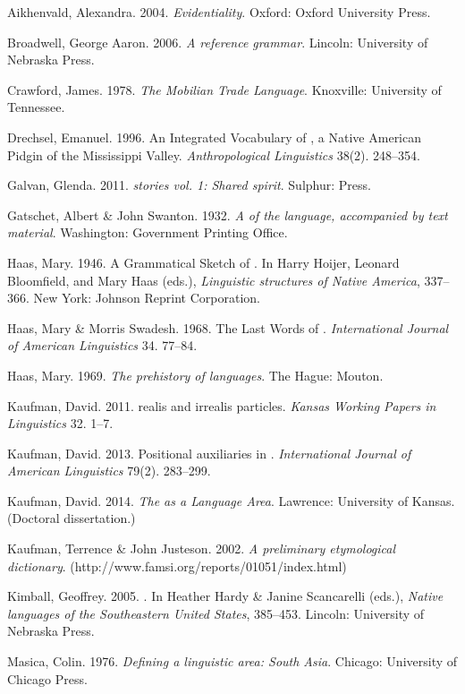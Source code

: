 \documentclass[output=paper]{LSP/langsci}
\begin{document}
\begin{reflist}

Aikhenvald, Alexandra. 2004. \emph{Evidentiality}. Oxford: Oxford University Press.

Broadwell, George Aaron. 2006. \emph{A  reference grammar}. Lincoln: University of Nebraska Press.

Crawford, James. 1978. \emph{The Mobilian Trade Language}. Knoxville: University of Tennessee.

Drechsel, Emanuel. 1996. An Integrated Vocabulary of , a Native American Pidgin of the Mississippi Valley. \emph{Anthropological Linguistics} 38(2). 248--354.

Galvan, Glenda. 2011. \emph{ stories vol. 1: Shared spirit}. Sulphur:  Press.

Gatschet, Albert \& John Swanton. 1932. \emph{A  of the  language, accompanied by text material}. Washington: Government Printing Office.

Haas, Mary. 1946. A Grammatical Sketch of . In Harry Hoijer, Leonard Bloomfield, and Mary Haas (eds.), \emph{Linguistic structures of Native America}, 337--366. New York: Johnson Reprint Corporation.

Haas, Mary \& Morris Swadesh. 1968. The Last Words of . \emph{International Journal of American Linguistics} 34. 77--84.

Haas, Mary. 1969. \emph{The prehistory of languages}. The Hague: Mouton.

Kaufman, David. 2011.  realis and irrealis particles. \emph{Kansas Working Papers in Linguistics} 32. 1--7.

Kaufman, David. 2013. Positional auxiliaries in . \emph{International Journal of American Linguistics} 79(2). 283--299.

Kaufman, David. 2014. \emph{The  as a Language Area}. Lawrence: University of Kansas. (Doctoral dissertation.)

Kaufman, Terrence \& John Justeson. 2002. \emph{A preliminary  etymological dictionary}. (http://www.famsi.org/reports/01051/index.html)

Kimball, Geoffrey. 2005. . In Heather Hardy \& Janine Scancarelli (eds.), \emph{Native languages of the Southeastern United States}, 385--453. Lincoln: University of Nebraska Press.

Masica, Colin. 1976. \emph{Defining a linguistic area: South Asia}. Chicago: University of Chicago Press.


\end{reflist}
\end{document}
